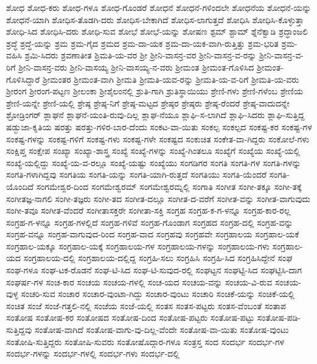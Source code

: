 {ಶೋಧ
ಶೋಧ-ಕರು
ಶೋಧ-ಗಳೂ
ಶೋಧ-ಗೊಂಡರೆ
ಶೋಧನೆ
ಶೋಧನೆ-ಗಳಿಂದಲೇ
ಶೋಧನೆಯ
ಶೋಧನೆ-ಯನ್ನು
ಶೋಧನೆ-ಯಾಗಿ
ಶೋಧಿಸ-ತೊಡಗಿ-ದರು
ಶೋಧಿಸ-ಬೇಕಾಗಿದೆ
ಶೋಧಿಸ-ಲಾಗುತ್ತದೆ
ಶೋಧಿಸಿ
ಶೋಧಿಸಿ-ಕೊಳ್ಳುತ್ತಾ
ಶೋಧಿ-ಸಿದ
ಶೋಧಿಸಿ-ದರು
ಶೋಧಿ-ಸುವ
ಶೋಭೆ
ಶೋಭೆ-ಯನ್ನು
ಶೋಷಣ
ಶ್ಟಮ್
ಶ್ಟಾಮ್
ಶ್ನೆನೆಕ್ವಾಡಿ
ಶ್ರದ್ಧಾಂಜಲಿ
ಶ್ರದ್ಧೆ
ಶ್ರದ್ಧೆ-ಯನ್ನು
ಶ್ರಮ
ಶ್ರಮ-ಗೈದ
ಶ್ರಮದ
ಶ್ರಮ-ದಾ-ಯಕ
ಶ್ರಮ-ದಾ-ಯಕ-ವಾಗಿ-ರುತ್ತಿತ್ತು
ಶ್ರಮ-ಭರಿತ
ಶ್ರಮ-ವಹಿಸಿ
ಶ್ರಮಿ-ಸಿದರು
ಶ್ರವಣಾತೀತ
ಶ್ರಿಮತಿ-ಯ-ವರ
ಶ್ರೀ
ಶ್ರೀನಿ-ವಾಸನ್ರ-ವರ
ಶ್ರೀನಿ-ವಾಸನ್ರ-ವ-ರನ್ನು
ಶ್ರೀನಿ-ವಾಸನ್ರ-ವ-ರಿಗೆ
ಶ್ರೀನಿ-ವಾಸನ್ರ-ವರು
ಶ್ರೀನಿ-ವಾಸಯ್ಯ
ಶ್ರೀನಿ-ವಾಸಯ್ಯ-ನ-ವರು
ಶ್ರೀಮಂತ
ಶ್ರೀಮಂತ-ಗೊಳಿಸಿದ
ಶ್ರೀಮಂತ-ಗೊಳಿಸಿದ್ದಾರೆ
ಶ್ರೀಮಂತರ
ಶ್ರೀಮಂತ-ವಾಗಿ
ಶ್ರೀಮತಿ
ಶ್ರೀಮತಿ-ಯವ-ರನ್ನು
ಶ್ರೀಮತಿ-ಯ-ವ-ರಿಗೆ
ಶ್ರೀಮತಿ-ಯ-ವರು
ಶ್ರೀರಂಗ
ಶ್ರೀರಂಗ-ಪಟ್ಟಣ
ಶ್ರೀಲಂಕಾ
ಶ್ರೀಶೈಲಂನಲ್ಲಿ
ಶ್ರುತಿ-ಗಾಗಿ
ಶ್ರುತಿಸ್ಥಾಯಿಯು
ಶ್ರೇಣಿ-ಗಳು
ಶ್ರೇಣಿ-ಗಳೆಂಬ
ಶ್ರೇಣಿಯ
ಶ್ರೇಣಿ-ಯನ್ನೇ
ಶ್ರೇಣಿ-ಯಲ್ಲಿ
ಶ್ರೇಷ್ಠ
ಶ್ರೇಷ್ಠ-ನಿಗೆ
ಶ್ರೇಷ್ಠ-ಮಟ್ಟದ
ಶ್ರೇಷ್ಠರ
ಶ್ರೇಷ್ಠರು
ಶ್ರೇಷ್ಠ-ರೆಂದರೆ
ಶ್ರೇಷ್ಠ-ವಾದುದನ್ನೇ
ಶ್ರೋಡ್ರಿಂಗರ್
ಶ್ಲಾಘನೆ
ಶ್ಲಾಘನೆ-ಯಂತಿ-ರುವು-ದಿಲ್ಲ
ಶ್ಲಾಘ-ನೆಯೂ
ಶ್ಲಾಘಿ-ಸ-ಲಾಗಿದೆ
ಶ್ಲಾಘಿ-ಸಿದರು
ಶ್ಲಾಘಿ-ಸುತ್ತಿದ್ದ
ಷಡ್ಭುಜಾ-ಕೃತಿಯ
ಷರತ್ತು
ಷರತ್ತು-ಗಳಿರ-ಬಾರ-ದೆಂದು
ಸಂಕಟ-ವಾ-ಯಿತು
ಸಂಕಲ್ಪ
ಸಂಕಲ್ಪದ
ಸಂಕಷ್ಟ-ಕರ
ಸಂಕಷ್ಟ-ಗಳ
ಸಂಕಷ್ಟ-ಗಳನ್ನು
ಸಂಕಷ್ಟ-ಗಳಿಗೆ
ಸಂಕಷ್ಟ-ಗಳು
ಸಂಕಷ್ಟ-ಗಳೇ
ಸಂಕಷ್ಟದ
ಸಂಕುಚಿತ
ಸಂಕೇತ-ವಾ-ಗಿದ್ದರು
ಸಂಕೋಲೆ-ಗಳು
ಸಂಕ್ಷಿಪ್ತ
ಸಂಕ್ಷೇಪ
ಸಂಖ್ಯಾ
ಸಂಖ್ಯಾ-ಶಾಸ್ತ್ರ
ಸಂಖ್ಯೆ
ಸಂಖ್ಯೆ-ಗಳನ್ನು
ಸಂಖ್ಯೆ-ಗಿಂತಲೂ
ಸಂಖ್ಯೆಗೆ
ಸಂಖ್ಯೆಯ
ಸಂಖ್ಯೆ-ಯಲ್ಲಿ
ಸಂಖ್ಯೆ-ಯಲ್ಲಿದ್ದು
ಸಂಖ್ಯೆ-ಯ-ವ-ರಲ್ಲೂ
ಸಂಖ್ಯೆ-ಯಷ್ಟು
ಸಂಖ್ಯೆಯು
ಸಂಗಡಿಗರ
ಸಂಗತಿ
ಸಂಗತಿ-ಗಳ
ಸಂಗತಿ-ಗಳನ್ನು
ಸಂಗತಿ-ಗಳಾಗಿದ್ದವು
ಸಂಗತಿಯ
ಸಂಗತಿ-ಯನ್ನು
ಸಂಗತಿ-ಯಾಗಿ-ರುತ್ತದೆ
ಸಂಗತಿಯು
ಸಂಗತಿ-ಯೆಂದರೆ
ಸಂಗತಿ-ಯೊಂದಿದೆ
ಸಂಗಮೇಶ್ವರ-ದಿಂದ
ಸಂಗಮೇಶ್ವರಮ್
ಸಂಗಮೇಶ್ವರಮ್ನಲ್ಲಿ
ಸಂಗಾತಿ
ಸಂಗೀತ
ಸಂಗೀ-ತಕ್ಕೂ
ಸಂಗೀ-ತಕ್ಕೆ
ಸಂಗೀತಜ್ಞ-ನಾಗಲಿ
ಸಂಗೀ-ತಜ್ಞರು
ಸಂಗೀ-ತದ
ಸಂಗೀತ-ದಲ್ಲೂ
ಸಂಗೀತ-ದ-ವರೆಗೆ
ಸಂಗೀತ-ವನ್ನು
ಸಂಗೀತ-ವಾಗುವುದು
ಸಂಗೀ-ತವೂ
ಸಂಗೀತ-ವೆಂದರೆ
ಸಂಗೀತಾಸಕ್ತರೇ
ಸಂಗೀತಾ-ಸಕ್ತಿ
ಸಂಗ್ರಹ
ಸಂಗ್ರಹ-ಕ-ಗ-ಳನ್ನೂ
ಸಂಗ್ರಹ-ಕಾರ-ರಲ್ಲ
ಸಂಗ್ರಹ-ಗ-ಳನ್ನೂ
ಸಂಗ್ರಹ-ಗಳಲ್ಲಿದೆ
ಸಂಗ್ರಹ-ಗಳಿವೆ
ಸಂಗ್ರಹ-ಗೊಂಡಾಗ
ಸಂಗ್ರಹದ
ಸಂಗ್ರಹ-ದಲ್ಲಿ
ಸಂಗ್ರಹ-ವನ್ನು
ಸಂಗ್ರಹ-ವನ್ನೂ
ಸಂಗ್ರಹ-ವಾಗುವುದ-ರಿಂದ
ಸಂಗ್ರಹ-ವಾದ
ಸಂಗ್ರಹವು
ಸಂಗ್ರಹವೇ
ಸಂಗ್ರಹಾಲಯ
ಸಂಗ್ರಹಾಲ-ಯಕೆ
ಸಂಗ್ರಹಾಲ-ಯಕ್ಕೂ
ಸಂಗ್ರಹಾಲ-ಯಕ್ಕೆ
ಸಂಗ್ರಹಾಲಯ-ಗಳ
ಸಂಗ್ರಹಾಲಯ-ಗಳನ್ನು
ಸಂಗ್ರಹಾಲಯ-ಗಳು
ಸಂಗ್ರಹಾಲ-ಯದ
ಸಂಗ್ರಹಾಲಯ-ದಲ್ಲಿ
ಸಂಗ್ರಹಾಲಯ-ದಲ್ಲಿದ್ದ
ಸಂಗ್ರಹಿ-ಸಲು
ಸಂಗ್ರಹಿಸಿ
ಸಂಗ್ರಹಿ-ಸಿದ
ಸಂಗ್ರಹಿಸಿದ್ದೇನೆ
ಸಂಘ
ಸಂಘ-ಗಳೂ
ಸಂಘ-ಟಕ-ರೊಡನೆ
ಸಂಘ-ಟಿ-ಸಿದ
ಸಂಘ-ಟಿ-ಸುವುದ-ರಲ್ಲಿ
ಸಂಘಟ್ಟನ
ಸಂಘಟ್ಟಿ-ಸಿದ
ಸಂಘಟ್ಟಿಸಿ-ದಾಗ
ಸಂಘರ್ಷ-ಗಳ
ಸಂಚ-ಕಾರ
ಸಂಚಯ
ಸಂಚಯ-ಗಳಲ್ಲಿ
ಸಂಚ-ಯದ
ಸಂಚಯ-ವನ್ನು
ಸಂಚಯ-ವಿ-ರುವ
ಸಂಚಯ-ವುಳ್ಳ
ಸಂಚರಿ-ಸುವ
ಸಂಚಾರ
ಸಂಚಾರ-ವುಂಟಾ-ಗಿದ್ದು
ಸಂಚಾರ-ವುಂಟು
ಸಂಚಾರಿ
ಸಂಚಿಕೆ-ಯನ್ನು
ಸಂಚಿಕೆ-ಯಲ್ಲಿ
ಸಂಚಿತ
ಸಂಜೆ
ಸಂಜೆ-ಗತ್ತಲಿ-ನಲ್ಲಿ
ಸಂಜೆಯ
ಸಂಜೆ-ಯಲ್ಲಿ
ಸಂತಸ
ಸಂತಸ-ಪಟ್ಟರು
ಸಂತಸ-ವೆಂಬಂತೆ
ಸಂತಾಪ
ಸಂತೋಷ
ಸಂತೋಷ-ಕರ
ಸಂತೋಷದ
ಸಂತೋಷ-ದಿಂದ
ಸಂತೋಷ-ಪಟ್ಟರು
ಸಂತೋಷ-ಪಟ್ಟು
ಸಂತೋಷ-ಪಡಿ-ಸುತ್ತಿದ್ದವು
ಸಂತೋಷ-ವಾಗಿದೆ
ಸಂತೋಷ-ವಾಗು-ವು-ದಿಲ್ಲ-ವೆಂದೇ
ಸಂತೋಷ-ವಾ-ಯಿತು
ಸಂತೋಷ-ವುಂಟು
ಸಂತೋಷಿ-ಸುತ್ತಿದ್ದರು
ಸಂತೋಷಿ-ಸುವರು
ಸಂತೋಷೊದ್ಗಾರ-ಗಳೂ
ಸಂತ್ರಸ್ತ
ಸಂದ
ಸಂದರ್ಭ
ಸಂದರ್ಭ-ಗಳ
ಸಂದರ್ಭ-ಗಳನ್ನು
ಸಂದರ್ಭ-ಗಳಲ್ಲಿ
ಸಂದರ್ಭ-ಗಳು
ಸಂದರ್ಭ-ದಲ್ಲಿ
}

